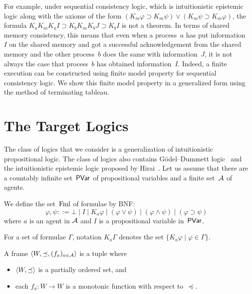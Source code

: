  For example,
 under {sequential consistency logic}, which is intuitionistic epistemic
 logic along with the axioms of the form
 $(K_m\varphi\supset K_m\psi) \vee (K_m\psi\supset K_m\varphi)$,
 the formula $K_aK_mK_aI \supset K_bK_mK_bJ\supset K_bI$ is not a
 theorem.
 In terms of shared memory consistency, this means that even when a
 process~$a$ has put information~$I$ on the shared memory and got a
 successful acknowledgement from the shared memory and the other
 process~$b$ does the same with information~$J$, it is not always the
 case that process~$b$ has obtained information~$I$\kern -2pt.
 Indeed, a finite execution can be constructed using
 finite model property for sequential consistency logic.
 We show this finite model property in a generalized form using the
 method of terminating tableau.

  \section{The Target Logics}
  \label{logic}

  The class of logics that we consider is a generalization of
  intuitionistic propositional logic.
  The class of logics also contains G\"{o}del--Dummett logic~\cite{dummett59}
  and the intuitionistic epistemic logic proposed by
  Hirai~\cite{hirailpar}.
  Let us assume that
  there are a countably infinite set~$\mathsf{PVar}$ of propositional
  variables and a
  finite set~$\mathcal A$ of agents.

  \begin{definition}
   We define the set~$\mathsf{\operatorname{Fml}}$ of formulae by BNF:
   \[
   \varphi,\psi ::= \bot\mid I\mid K_a\varphi\mid (\varphi\vee\psi)\mid
   (\varphi\land\psi)\mid (\varphi\supset\psi)
   \]
   where $a$ is an agent in $\mathcal A$
   and $I$ is a propositional variable in~$\mathsf{PVar}$.
  \end{definition}

  For a set of formulae $\Gamma\!$, notation $K_a\Gamma$ denotes the set
  $\{K_a\varphi\mid\varphi\in\Gamma\}$\enspace.

  \begin{definition}
   A frame $\langle{W,\preceq,(f_a)_{a\in \mathcal A}}\rangle$ is a tuple where
   \begin{itemize}
    \item $\langle{W,\preceq}\rangle$ is a partially ordered set, and
    \item each $f_a\colon W\rightarrow W$ is a monotonic function with
	  respect to~$\preceq$.
   \end{itemize}
  \end{definition}

